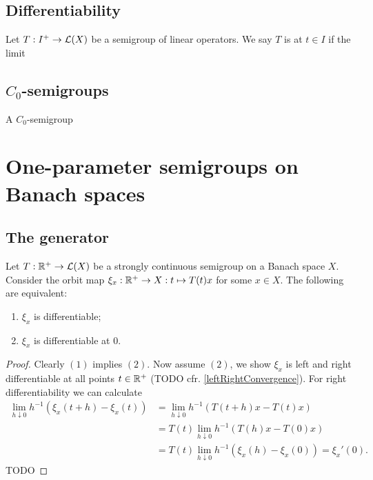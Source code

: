 \begin{definition}

\end{definition}

\subsection{Differentiability}
\begin{definition}
Let $T: I^+ \to \operatorname{\mathcal{L}}(X)$ be a semigroup of linear operators. We say $T$ is  at $t\in I$ if the limit
\[  \]
\end{definition}

\subsection{$C_0$-semigroups}
\begin{definition}
A $C_0$-semigroup
\end{definition}

\section{One-parameter semigroups on Banach spaces}
\subsection{The generator}

\begin{lemma}
Let $T: \mathbb{R}^+\to \operatorname{\mathcal{L}}(X)$ be a strongly continuous semigroup on a Banach space $X$. Consider the orbit map $\xi_x: \mathbb{R}^+ \to X: t\mapsto T(t)x$ for some $x\in X$. The following are equivalent:
\begin{enumerate}
\item $\xi_x$ is differentiable;
\item $\xi_x$ is differentiable at $0$.
\end{enumerate}
\end{lemma}
\begin{proof}
Clearly $(1)$ implies $(2)$. Now assume $(2)$, we show $\xi_x$ is left and right differentiable at all points $t\in\mathbb{R}^+$ (TODO cfr. \ref{leftRightConvergence}). For right differentiability we can calculate
\begin{align*}
\lim_{h\downarrow 0} h^{-1}(\xi_x(t+h) - \xi_x(t)) &= \lim_{h\downarrow 0} h^{-1}(T(t+h)x - T(t)x) \\
&= T(t)\lim_{h\downarrow 0} h^{-1}(T(h)x - T(0)x) \\
&= T(t)\lim_{h\downarrow 0} h^{-1}(\xi_x(h) - \xi_x(0)) = \xi_x'(0).
\end{align*}
TODO
\end{proof}

